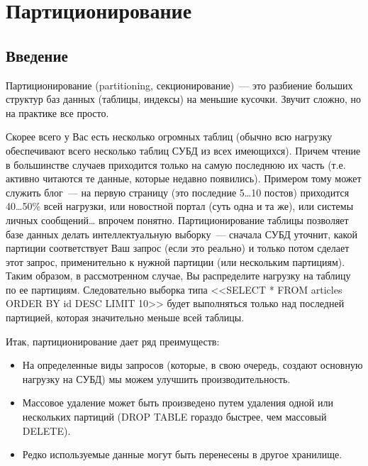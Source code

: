 \chapter{Партиционирование}
\begin{epigraphs}
\end{epigraphs}
\section{Введение}
Партиционирование (partitioning, секционирование)~--- это разбиение больших структур баз данных (таблицы, индексы) на меньшие кусочки. 
Звучит сложно, но на практике все просто.

Скорее всего у Вас есть несколько огромных таблиц (обычно всю нагрузку обеспечивают всего несколько таблиц СУБД из всех имеющихся). 
Причем чтение в большинстве случаев приходится только на самую последнюю их часть (т.е. активно читаются те данные, которые 
недавно появились). Примером тому может служить блог~--- на первую страницу (это последние 5\dots10 постов) приходится 40\dots50\% 
всей нагрузки, или новостной портал (суть одна и та же), или системы личных сообщений… впрочем понятно. Партиционирование 
таблицы позволяет базе данных делать интеллектуальную выборку~--- сначала СУБД уточнит, какой партиции соответствует Ваш запрос 
(если это реально) и только потом сделает этот запрос, применительно к нужной партиции (или нескольким партициям). Таким образом, 
в рассмотренном случае, Вы распределите нагрузку на таблицу по ее партициям. Следовательно выборка типа 
<<SELECT * FROM articles ORDER BY id DESC LIMIT 10>> будет выполняться только над последней партицией, которая значительно 
меньше всей таблицы.

Итак, партиционирование дает ряд преимуществ:
\begin{itemize}
\item На определенные виды запросов (которые, в свою очередь, создают основную нагрузку на СУБД) мы можем улучшить производительность.
\item Массовое удаление может быть произведено путем удаления одной или нескольких партиций 
(DROP TABLE гораздо быстрее, чем массовый DELETE).
\item Редко используемые данные могут быть перенесены в другое хранилище.
\end{itemize}

